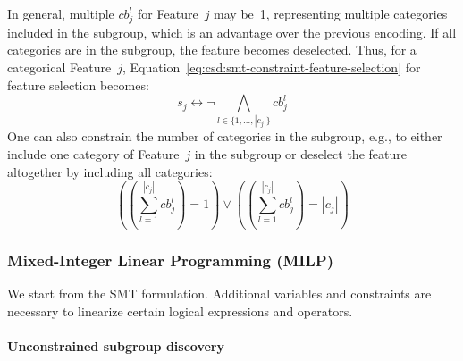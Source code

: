 \documentclass{article}
\theoremstyle{definition}
\begin{document}
In general, multiple $\mathit{cb}^l_j$ for Feature~$j$ may be~1, representing multiple categories included in the subgroup, which is an advantage over the previous encoding.
If all categories are in the subgroup, the feature becomes deselected.
Thus, for a categorical Feature~$j$, Equation~\ref{eq:csd:smt-constraint-feature-selection} for feature selection becomes:
%
\begin{equation}
	s_j \leftrightarrow \lnot \bigwedge_{l \in \{1, \dots, |c_j|\}} \mathit{cb}^l_j
	\label{eq:csd:category-constraint:feature-selection}
\end{equation}
%
One can also constrain the number of categories in the subgroup, e.g., to either include one category of Feature~$j$ in the subgroup or deselect the feature altogether by including all categories:
%
\begin{equation}
	 \left( \left( \sum_{l=1}^{|c_j|} \mathit{cb}^l_j \right) = 1 \right) \lor \left( \left( \sum_{l=1}^{|c_j|} \mathit{cb}^l_j \right) = |c_j| \right)
	\label{eq:csd:category-constraint:cardinality}
\end{equation}

\subsubsection{Mixed-Integer Linear Programming (MILP)}
\label{sec:csd:appendix:further-encodings:milp}

We start from the SMT formulation.
Additional variables and constraints are necessary to linearize certain logical expressions and operators.

\paragraph{Unconstrained subgroup discovery}
\end{document}
